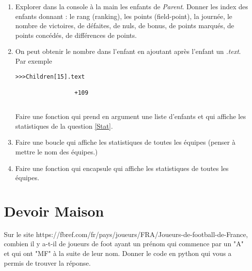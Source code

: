 \documentclass[12pt,fleqn]{article} %
\begin{document}
\begin{exercise}
\begin{enumerate}
	\item \label{Stat}Explorer dans la console à la main les enfants de \textit{Parent}. Donner les index des enfants donnant : le rang (ranking), les points (field-point), la journée, le nombre de victoires, de défaites, de nuls, de bonus, de points marqués, de points concédés, de différences de points.
	\item On peut obtenir le nombre dans l'enfant en ajoutant après l'enfant un \textit{.text}. Par exemple
	\begin{center}
		\begin{varwidth}[t]{.5\textwidth}
			\begin{lstlisting}[language=iPython,linewidth = 4cm]
>>>Children[15].text

                 +109
                 
			\end{lstlisting}
	\end{varwidth}\end{center}
	Faire une fonction qui prend en argument une liste d'enfants et qui affiche les statistiques de la question \ref{Stat}.
	\item Faire une boucle qui affiche les statistiques de toutes les équipes (penser à mettre le nom des équipes.)
	\item Faire une fonction qui encapsule qui affiche les statistiques de toutes les équipes.
	
	

\end{enumerate}

\end{exercise}

\section{Devoir Maison}

Sur le site https://fbref.com/fr/pays/joueurs/FRA/Joueurs-de-football-de-France, combien il y a-t-il de joueurs de foot ayant un prénom qui commence par un "A" et qui ont "MF" à la suite de leur nom.
Donner le code en python qui vous a permis de trouver la réponse.
\end{document}
